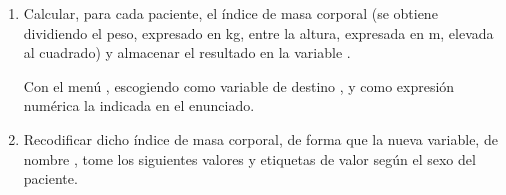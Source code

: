\documentclass[a4paper]{article}
\begin{document}
\begin{enumerate}
\begin{center}
\end{center}

\begin{indicacion}{
Para recodificar una variable, se utiliza el proceso ya explicado en
la práctica de Introducción a SPSS, con el menú
, escogiendo
la , dando nombre a la , utilizando el botón , y posteriormente
el botón  para delimitar las
categorías de la nueva variable.

}
\end{indicacion}




\item Calcular, para cada paciente, el índice de masa corporal (se
obtiene dividiendo el peso, expresado en kg, entre la altura,
expresada en m, elevada al cuadrado) y almacenar el resultado en la
variable .

\begin{indicacion}{
Con el menú , escogiendo como
variable de destino , y como expresión numérica
la indicada en el enunciado.

}
\end{indicacion}

\item Recodificar dicho índice de masa corporal, de forma que la
nueva variable, de nombre , tome los siguientes
valores y etiquetas de valor según el sexo del paciente.


\end{enumerate}
\end{document}
